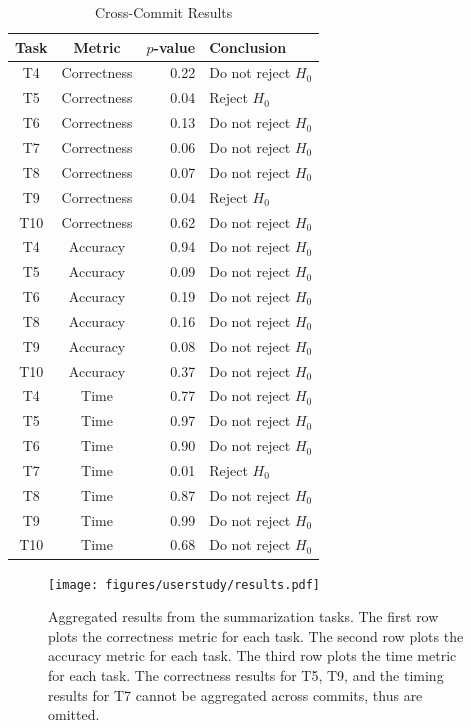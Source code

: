 \begin{table}[htpb]
  \centering
  \caption{Cross-Commit Results}
  \label{tab:cross_commit_results}
  \begin{tabular}{ccrl}
    \toprule
    Task & Metric      & $p$-value & Conclusion\\\midrule
    T4   & Correctness & 0.22      & Do not reject $H_0$\\
    T5   & Correctness & 0.04      & Reject $H_0$\\
    T6   & Correctness & 0.13      & Do not reject $H_0$\\
    T7   & Correctness & 0.06      & Do not reject $H_0$\\
    T8   & Correctness & 0.07      & Do not reject $H_0$\\
    T9   & Correctness & 0.04      & Reject $H_0$\\
    T10  & Correctness & 0.62      & Do not reject $H_0$\\

    T4  & Accuracy & 0.94 & Do not reject $H_0$\\
    T5  & Accuracy & 0.09 & Do not reject $H_0$\\
    T6  & Accuracy & 0.19 & Do not reject $H_0$\\
    T8  & Accuracy & 0.16 & Do not reject $H_0$\\
    T9  & Accuracy & 0.08 & Do not reject $H_0$\\
    T10 & Accuracy & 0.37 & Do not reject $H_0$\\

    T4  & Time & 0.77 & Do not reject $H_0$\\
    T5  & Time & 0.97 & Do not reject $H_0$\\
    T6  & Time & 0.90 & Do not reject $H_0$\\
    T7  & Time & 0.01 & Reject $H_0$\\
    T8  & Time & 0.87 & Do not reject $H_0$\\
    T9  & Time & 0.99 & Do not reject $H_0$\\
    T10 & Time & 0.68 & Do not reject $H_0$\\
    \bottomrule
  \end{tabular}
\end{table}

\begin{figure}[htpb]
  \centering
  \texttt{[image: figures/userstudy/results.pdf]}
  \caption{Aggregated results from the summarization tasks. The first row plots the
    correctness metric for each task. The second row plots the
    accuracy metric for each task. The third row plots the time metric
    for each task. The correctness results for T5, T9, and the timing
    results for T7 cannot be aggregated across commits, thus are
    omitted.}
  \label{fig:summarization_results}
\end{figure}

